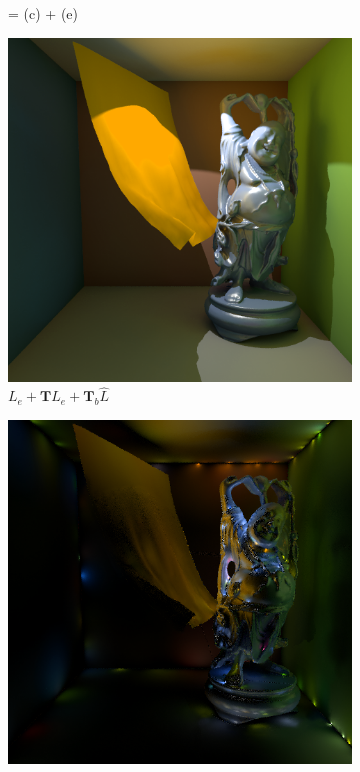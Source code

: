 \begin{figure}
\begin{fullwidth}
\begin{subfigure}[b]{0.195\thewidth}
		\caption{= (c) + (e)}
	\end{subfigure}
	\begin{subfigure}[b]{0.195\thewidth}
		\includegraphics[width=1.0\textwidth]{figures/ir/ir-7-2}
		\caption{$L_e+\mathbf{T}L_e+\mathbf{T}_b\hat{L}$}
	\end{subfigure}
	\begin{subfigure}[b]{0.195\thewidth}
		\includegraphics[width=1.0\textwidth]{figures/ir/ir-7-3}

\end{subfigure}
\end{fullwidth}
\end{figure}
